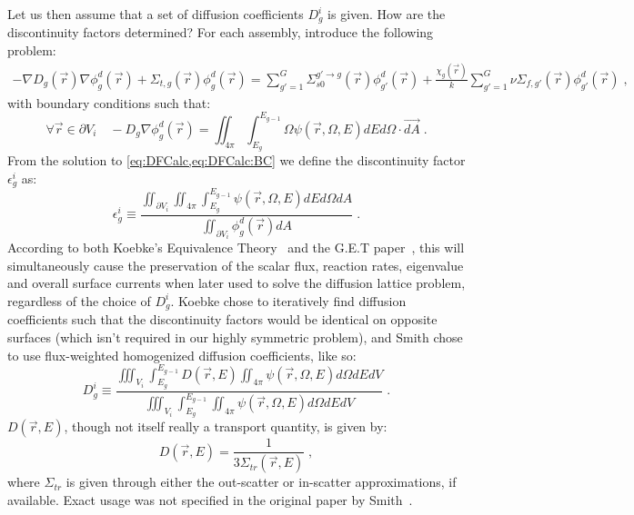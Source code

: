 \documentclass[a4paper,letterpaper,12pt,oneside,draft]{article}
\newcommand{\eec}{\;,}
\newcommand{\eep}{\;.}
\newcommand{\intg}[2][g]{\ensuremath{\int_{E_{#1}}^{E_{#1-1}} #2 dE}}
\newcommand{\vr}{\ensuremath{\vec{r}}}
\newcommand{\psif}[1][]{\psi(\vr,\Omega#1,E#1)}
\begin{document}
    Let us then assume that a set of diffusion coefficients $D_g^i$ is given. 
    How are the discontinuity factors determined?
    For each assembly, introduce the following problem:
    \begin{align}
    \label{eq:DFCalc}
        -\nabla D_g(\vr)\nabla\phi_g^d(\vr) +
        \Sigma_{t,g}(\vr)\phi_g^d(\vr) = 
        \sum_{g'=1}^G \Sigma_{s0}^{g'\to g}(\vr)\phi_{g'}^d(\vr) + \frac{\chi_g(\vr)}{k}\sum_{g'=1}^{G}\nu\Sigma_{f,g'}(\vr)\phi_{g'}^d(\vr)\eec
    \end{align}
    with boundary conditions such that: 
    \begin{equation}
    \label{eq:DFCalc:BC}
        \forall \vr\in\partial V_i\quad -D_g\nabla\phi_g^d(\vr) = \iint_{4\pi} \intg{\Omega\psif}d\Omega \cdot \vec{dA}\eep
    \end{equation}
    From the solution to \cref{eq:DFCalc,eq:DFCalc:BC} we define the discontinuity factor $\epsilon_{g}^i$ as:
    \begin{equation}
    \label{def:DF}
    \epsilon_g^i \equiv \frac{\iint_{\partial V_i}\iint_{4\pi}\intg{\psif} d\Omega dA}{\iint_{\partial V_i}\phi_g^d(\vr)dA}\eep
    \end{equation}
    According to both Koebke's Equivalence Theory~\cite{Koebke} and the G.E.T paper~\cite{SmithHomogenization}, this will simultaneously cause the preservation of the scalar flux, reaction rates, eigenvalue and overall surface currents when later used to solve the diffusion lattice problem, regardless of the choice of $D_g^i$.
    Koebke chose to iteratively find diffusion coefficients such that the discontinuity factors would be identical on opposite surfaces (which isn't required in our highly symmetric problem), and Smith chose to use flux-weighted homogenized diffusion coefficients, like so:
    \begin{equation}
    \label{def:SmithDiffCoeff}
        D_g^i \equiv \frac{\iiint_{V_i}\intg{D(\vr,E)\iint_{4\pi}\psif d\Omega}dV}{\iiint_{V_i}\intg{\iint_{4\pi}\psif d\Omega}dV} \eep
    \end{equation}
    $D(\vr,E)$, though not itself really a transport quantity, is given by:
    \begin{equation}
    \label{eq:SmithDiffCoeff:TranXS}
        D(\vr,E) = \frac{1}{3\Sigma_{tr}(\vr,E)}\eec
    \end{equation}
    where $\Sigma_{tr}$ is given through either the out-scatter or in-scatter approximations, if available. Exact usage was not specified in the original paper by Smith~\cite{SmithHomogenization}.
    
\end{document}
